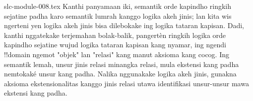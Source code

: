 \begin{filecontents*}[overwrite]{slc-module-008.tex}
Kanthi panyamaan iki,
semantik orde kapindho
ringkih sejatine padha
karo semantik lumrah
kanggo logika akeh jinis;
lan kita wis ngerteni
yen logika akeh jinis
bisa dilebokake ing
logika tataran kapisan. Dadi,
kanthi nggatekake
terjemahan bolak-balik,
pangertèn ringkih
logika orde kapindho
sejatine wujud logika tataran
kapisan kang nyamar,
ing ngendi !!{domain}
ngemot "objek" lan
"relasi" kang manut
aksioma kang cocog. Ing semantik lemah, unsur jinis relasi minangka relasi, mula ekstensi kang padha nemtokaké unsur kang padha. Nalika nggunakake logika akeh jinis, gunakna aksioma ekstensionalitas kanggo jinis relasi utawa identifikasi unsur-unsur mawa ekstensi kang padha.


\end{filecontents*}

